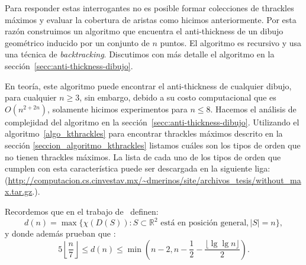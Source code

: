   Para responder estas interrogantes no es posible formar colecciones de thrackles máximos y
  evaluar la cobertura de aristas como hicimos anteriormente. Por esta razón construimos un algoritmo que
  encuentra el anti-thickness de un dibujo geométrico inducido por un conjunto de $n$ puntos. El algoritmo
  es recursivo y usa una técnica de \emph{backtracking}. Discutimos con más detalle el algoritmo en la
  sección~\ref{secc:anti-thickness-dibujo}.

  En teoría, este algoritmo puede encontrar el anti-thickness de cualquier dibujo, para cualquier
  $n \geq 3$, sin embargo, debido a su costo computacional que es $O(n^{2+2n})$, solamente hicimos
  experimentos para $n\leq 8$. Hacemos el análisis de complejidad del algoritmo en la
  sección~\ref{secc:anti-thickness-dibujo}. Utilizando el algoritmo~\ref{algo_kthrackles} para encontrar
  thrackles máximos descrito en la sección \ref{seccion_algoritmo_kthrackles} listamos cuáles son los tipos
  de orden que no tienen thrackles máximos. La lista de cada uno de los tipos de orden que cumplen con esta
  característica puede ser descargada en la siguiente liga:
  (\url{http://computacion.cs.cinvestav.mx/~dmerinos/site/archivos_tesis/without_max.tar.gz}.).

  Recordemos que en el trabajo de~\cite{Araujo2005} definen:
  \[
  d(n) = \max\{\chi(D(S)): S\subset \mathbb{R}^2 \text{ está en posición general}, |S|=n\},
  \]
  y donde además prueban que :
  \begin{equation}\label{eq_dn}
  5\left\lfloor\frac{n}{7}\right\rfloor \leq d(n) \leq \min\left(n-2,n-\frac{1}{2}-\frac{\lfloor \lg \lg
  n\rfloor}{2}\right).
  \end{equation}

